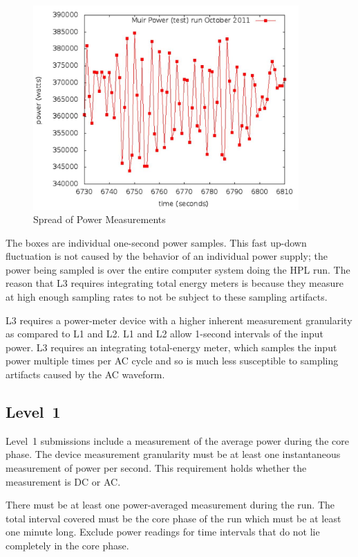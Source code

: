 \begin{figure}
\centering
\includegraphics[width=4in]{fig3-2}
\caption{Spread of Power Measurements}
\label{fig:sopm}
\end{figure}

The boxes are individual one-second power samples.
This fast up-down fluctuation is not caused by the behavior of an individual power supply; the power being sampled is over the entire computer system doing the HPL run.
The reason that L3 requires integrating total energy meters is because they measure at high enough sampling rates to not be subject to these sampling artifacts.

L3 requires a power-meter device with a higher inherent measurement granularity as compared to L1 and L2.
L1 and L2 allow 1-second intervals of the input power.
L3 requires an integrating total-energy meter, which samples the input power multiple times per AC cycle and so is much less susceptible to sampling artifacts caused by the AC waveform.

\subsection{Level~1}

Level~1 submissions include a measurement of the average power during the core phase.
The device measurement granularity must be at least one instantaneous measurement of power per second.
This requirement holds whether the measurement is DC or AC.

There must be at least one power-averaged measurement during the run.
The total interval covered must be the core phase of the run which must be at least one minute long.
Exclude power readings for time intervals that do not lie completely in the core phase.

